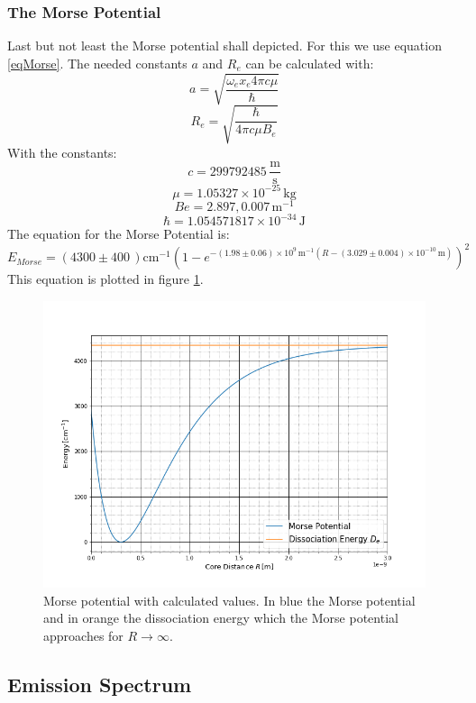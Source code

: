 \subsubsection{The Morse Potential}
Last but not least the Morse potential shall depicted. For this we use equation \ref{eqMorse}. The needed constants $a$ and $R_e$ can be calculated with:
\begin{equation}
	a=\sqrt{\frac{\omega_ex_e4\pi c\mu}{\hbar}}
\end{equation}
\begin{equation}
	R_e=\sqrt{\frac{\hbar}{4\pi c\mu B_e}}
\end{equation}
With the constants:
$$c = 299792485\,\frac{\text{m}}{\text{s}}$$
$$\mu = 1.05327\times 10^{-25}\,\text{kg}$$
$$Be = 2.897,0.007\,\text{m}^{-1}$$
$$\hbar = 1.054571817\times 10^{-34}\,\text{J}$$
The equation for the Morse Potential is:
$$E_{Morse}=(4300\pm400\,)\text{cm}^{-1}\left(1-e^{-(1.98\pm0.06)\times10^{9}\,\text{m}^{-1}(R-(3.029\pm0.004)\times 10^{-10}\,\text{m})}\right)^2$$
This equation is plotted in figure \ref{figMorse}.
\begin{figure}[ht]
	\includegraphics[scale=0.5]{Bild/Morse.png}
	\centering
	\caption[Calculated Morse Potential]{\small Morse potential with calculated values. In blue the Morse potential and in orange the dissociation energy which the Morse potential approaches for $R\rightarrow\infty$.}
	\label{figMorse}
\end{figure}
\subsection{Emission Spectrum}
